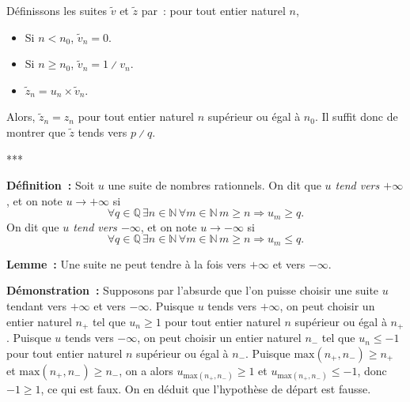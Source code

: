     Définissons les suites $\tilde{v}$ et $\tilde{z}$ par : pour tout entier naturel $n$, 
    \begin{itemize}[nosep]
        \item Si $n < n_0$, $\tilde{v}_n = 0$.
        \item Si $n \geq n_0$, $\tilde{v}_n = 1 \divslash v_n$.
        \item $\tilde{z}_n = u_n \times \tilde{v}_n$.
    \end{itemize}
    Alors, $\tilde{z}_n = z_n$ pour tout entier naturel $n$ supérieur ou égal à $n_0$. 
    Il suffit donc de montrer que $\tilde{z}$ tends vers $p \divslash q$.
    
    ***

\medskip

\noindent\textbf{Définition :} Soit $u$ une suite de nombres rationnels. 
    On dit que \emph{$u$ tend vers $+\infty$}, et on note $u \rightarrow + \infty$ si
    \begin{equation*}
        \forall q \in \mathbb{Q} \, 
        \exists n \in \mathbb{N} \, 
        \forall m \in \mathbb{N} \, 
        m \geq n \Rightarrow
            u_m \geq q.
    \end{equation*}
    On dit que \emph{$u$ tend vers $-\infty$}, et on note $u \rightarrow - \infty$ si
    \begin{equation*}
        \forall q \in \mathbb{Q} \, 
        \exists n \in \mathbb{N} \, 
        \forall m \in \mathbb{N} \, 
        m \geq n \Rightarrow
            u_m \leq q.
    \end{equation*}

\medskip

\noindent\textbf{Lemme :} Une suite ne peut tendre à la fois vers $+\infty$ et vers $-\infty$. 

\medskip

\noindent\textbf{Démonstration :} Supposons par l'absurde que l'on puisse choisir une suite $u$ tendant vers $+\infty$ et vers $-\infty$.
    Puisque $u$ tends vers $+\infty$, on peut choisir un entier naturel $n_+$ tel que $u_n \geq 1$ pour tout entier naturel $n$ supérieur ou égal à $n_+$.
    Puisque $u$ tends vers $-\infty$, on peut choisir un entier naturel $n_-$ tel que $u_n \leq -1$ pour tout entier naturel $n$ supérieur ou égal à $n_-$.
    Puisque $\mathrm{max}(n_+, n_-) \geq n_+$ et  $\mathrm{max}(n_+, n_-) \geq n_-$, on a alors $u_{ \mathrm{max}(n_+, n_-) } \geq 1$ et $u_{ \mathrm{max}(n_+, n_-) } \leq -1$, donc $-1 \geq 1$, ce qui est faux.
    On en déduit que l'hypothèse de départ est fausse.


